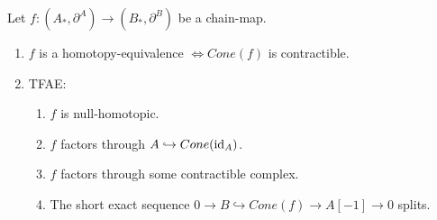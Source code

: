 \documentclass[fontsize=11pt,fleqn,a4paper]{scrartcl}
\begin{document}
\begin{lemma}
Let $f:(A_\ast,\partial^A)\to(B_\ast,\partial^B)$ be a chain-map.
\begin{enumerate}
\item $f$ is a homotopy-equivalence $\iff Cone(f)$ is contractible.
\item TFAE:
\begin{enumerate}
\item $f$ is null-homotopic.
\item $f$ factors through $A\hookrightarrow Cone(\operatorname{id}_A)$.
\item $f$ factors through some contractible complex.
\item The short exact sequence $0\to B\hookrightarrow Cone(f)\to A[-1]\to 0$ splits.
\end{enumerate}
\end{enumerate}
\end{lemma}
\end{document}

